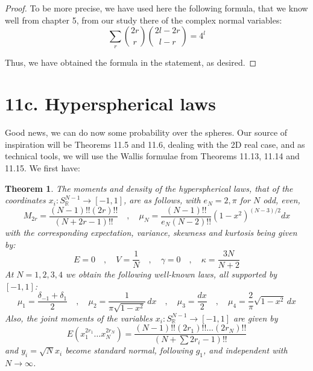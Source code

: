 \documentclass[12pt]{amsbook}
\newtheorem{theorem}{Theorem}[chapter]
\begin{document}
\begin{proof}
To be more precise, we have used here the following formula, that we know well from chapter 5, from our study there of the complex normal variables:
$$\sum_r\binom{2r}{r}\binom{2l-2r}{l-r}=4^l$$

Thus, we have obtained the formula in the statement, as desired.
\end{proof}

\section*{11c. Hyperspherical laws}

Good news, we can do now some probability over the spheres. Our source of inspiration will be Theorems 11.5 and 11.6, dealing with the 2D real case, and as technical tools, we will use the Wallis formulae from Theorems 11.13, 11.14 and 11.15. We first have:


\begin{theorem}
The moments and density of the hyperspherical laws, that of the coordinates $x_i:S^{N-1}_\mathbb R\to[-1,1]$, are as follows, with $e_N=2,\pi$ for $N$ odd, even,
$$M_{2r}=\frac{(N-1)!!(2r)!!}{(N+2r-1)!!}\quad,\quad\mu_N=\frac{(N-1)!!}{e_N(N-2)!!}(1-x^2)^{(N-3)/2}dx$$
with the corresponding expectation, variance, skewness and kurtosis being given by:
$$E=0\quad,\quad V=\frac{1}{N}\quad,\quad\gamma=0\quad,\quad\kappa=\frac{3N}{N+2}$$
At $N=1,2,3,4$ we obtain the following well-known laws, all supported by $[-1,1]$:
$$\mu_1=\frac{\delta_{-1}+\delta_1}{2}\quad,\quad\mu_2=\frac{1}{\pi\sqrt{1-x^2}}\,dx
\quad,\quad\mu_3=\frac{dx}{2}\quad,\quad\mu_4=\frac{2}{\pi}\sqrt{1-x^2}\,dx$$
Also, the joint moments of the variables $x_i:S^{N-1}_\mathbb R\to[-1,1]$ are given by
$$E(x_1^{2r_1}\ldots x_N^{2r_N})=\frac{(N-1)!!(2r_1)!!\ldots(2r_N)!!}{(N+\sum 2r_i-1)!!}$$
and $y_i=\sqrt{N}x_i$ become standard normal, following $g_1$, and independent with $N\to\infty$.
\end{theorem}
\end{document}
